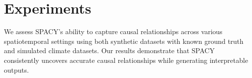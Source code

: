 
\section{Experiments}






We assess SPACY's ability to capture causal relationships across various spatiotemporal settings using both synthetic datasets with known ground truth and simulated climate datasets. Our results demonstrate that SPACY consistently uncovers accurate causal relationships while generating interpretable outputs. 

